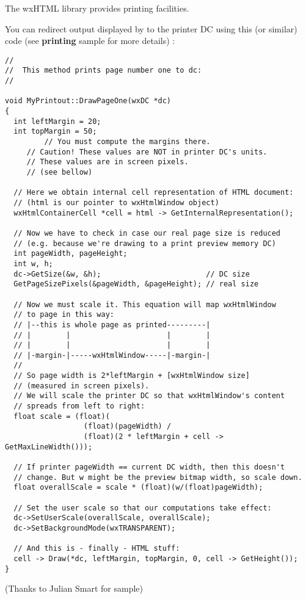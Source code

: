 \label{printing}

The wxHTML library provides printing facilities. 

You can redirect output displayed by 
to the printer DC using this (or similar) code (see {\bf printing} sample for
more details) :

\begin{verbatim}
//
//  This method prints page number one to dc:
//

void MyPrintout::DrawPageOne(wxDC *dc)
{
  int leftMargin = 20;
  int topMargin = 50;
         // You must compute the margins there. 
	 // Caution! These values are NOT in printer DC's units.
	 // These values are in screen pixels.
	 // (see bellow)

  // Here we obtain internal cell representation of HTML document:
  // (html is our pointer to wxHtmlWindow object)
  wxHtmlContainerCell *cell = html -> GetInternalRepresentation();

  // Now we have to check in case our real page size is reduced
  // (e.g. because we're drawing to a print preview memory DC)
  int pageWidth, pageHeight;
  int w, h;
  dc->GetSize(&w, &h);                        // DC size
  GetPageSizePixels(&pageWidth, &pageHeight); // real size

  // Now we must scale it. This equation will map wxHtmlWindow
  // to page in this way:
  // |--this is whole page as printed---------|
  // |        |                      |        |
  // |        |                      |        |
  // |-margin-|-----wxHtmlWindow-----|-margin-|
  //
  // So page width is 2*leftMargin + [wxHtmlWindow size]
  // (measured in screen pixels).
  // We will scale the printer DC so that wxHtmlWindow's content
  // spreads from left to right:
  float scale = (float)(
                  (float)(pageWidth) /
                  (float)(2 * leftMargin + cell -> GetMaxLineWidth()));

  // If printer pageWidth == current DC width, then this doesn't
  // change. But w might be the preview bitmap width, so scale down.
  float overallScale = scale * (float)(w/(float)pageWidth);

  // Set the user scale so that our computations take effect:
  dc->SetUserScale(overallScale, overallScale);
  dc->SetBackgroundMode(wxTRANSPARENT);

  // And this is - finally - HTML stuff:
  cell -> Draw(*dc, leftMargin, topMargin, 0, cell -> GetHeight());
}
\end{verbatim}

(Thanks to Julian Smart for sample)
